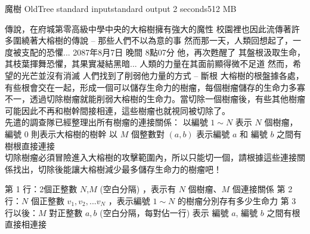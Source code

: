 \gdef\thisproblemauthor{}
\gdef\thisproblemdeveloper{}
\gdef\thisproblemorigin{}
\begin{problem}{魔樹 OldTree}
{standard input}{standard output}
{2 seconds}{512 MB}{}

傳說，在府城第零高級中學中央的大榕樹擁有強大的魔性\newline
校園裡也因此流傳著許多圍繞著大榕樹的傳說 -- 那些人們不以為意的事\newline
然而那一天，人類回想起了，一度被支配的恐懼...\newline
\newline
2087年8月7日 晚間 8點07分\newline
他，再次甦醒了\newline
其盤根汲取生命，其枝葉揮舞恐懼，其果實凝結黑暗...\newline
人類的力量在其面前顯得微不足道\newline
然而，希望的光芒並沒有消滅\newline
人們找到了削弱他力量的方式 -- 斷根\newline
\newline
大榕樹的根盤據各處，有些根會交在一起，形成一個可以儲存生命力的樹瘤，每個樹瘤儲存的生命力多寡不一，透過切除樹瘤就能削弱大榕樹的生命力。當切除一個樹瘤後，有些其他樹瘤可能因此不再和樹幹間接相連，這些樹瘤也就視同被切除了。\\
\newline
先遣的調查隊已經整理出所有樹瘤的連接關係：\newline
以編號 $1 \sim N$ 表示 $N$ 個樹瘤，編號 0 則表示大榕樹的樹幹\newline
以 $M$ 個整數對 $(a,b)$ 表示編號 $a$ 和 編號 $b$ 之間有樹根直接連接\\
\newline
切除樹瘤必須冒險進入大榕樹的攻擊範圍內，所以只能切一個，請根據這些連接關係找出，切除後能讓大榕樹減少最多儲存生命力的樹瘤吧！\newline


\InputFile

第 1 行：2個正整數 $N$,$M$ (空白分隔) ，表示有 $N$ 個樹瘤、$M$ 個連接關係 \newline
第 2 行：$N$ 個正整數 $v_1,v_2,...v_N$ ，表示編號 $1 \sim N$ 的樹瘤分別存有多少生命力 \newline
第 3 行以後：$M$ 對正整數 $a,b$ (空白分隔，每對佔一行) \newline
                      表示 編號 $a$, 編號 $b$ 之間有根直接相連接  \newline


\end{problem}
